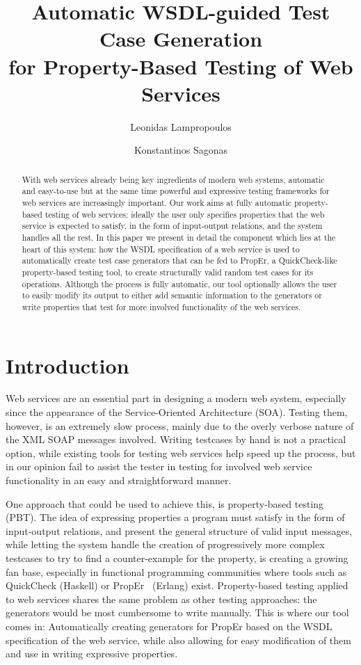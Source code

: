 \documentclass[submission,copyright,a4]{eptcs}
\title{Automatic WSDL-guided Test Case Generation\\
       for Property-Based Testing of Web Services}
\author{Leonidas Lampropoulos \and Konstantinos Sagonas}
\begin{document}
\maketitle

\begin{abstract}
With web services already being key ingredients of modern web systems,
automatic and easy-to-use but at the same time powerful and expressive
testing frameworks for web services are increasingly important. Our
work aims at fully automatic property-based testing of web services:
ideally the user only specifies properties that the web service is
expected to satisfy, in the form of input-output relations, and the
system handles all the rest. In this paper we present in detail the
component which lies at the heart of this system: how the WSDL
specification of a web service is used to automatically create test
case generators that can be fed to PropEr, a QuickCheck-like
property-based testing tool, to create structurally valid random
test cases for its operations. Although the process is fully automatic,
our tool optionally allows the user to easily modify its output to
either add semantic information to the generators or write properties
that test for more involved functionality of the web services.
\end{abstract}


\section{Introduction}


Web services are an essential part in designing a modern web system, 
especially since the appearance of the Service-Oriented Architecture (SOA).
Testing them, however, is an extremely slow process, mainly due to
the overly verbose nature of the XML SOAP messages involved. Writing 
testcases by hand is not a practical option, while existing tools for 
testing web services help speed up the process, but in our opinion fail 
to assist the tester in testing for involved web service functionality
in an easy and straightforward manner.


One approach that could be used to achieve this, is property-based testing (PBT).
The idea of expressing properties a program must satisfy in the form of 
input-output relations, and present the general structure of valid input 
messages, while letting the system handle the creation of progressively more 
complex testcases to try to find a counter-example for the property, is creating 
a growing fan base, especially in functional programming communities where 
tools such as QuickCheck (Haskell) or PropEr ~\cite{proper_tool}(Erlang) exist. 
Property-based testing applied to web services shares the same problem as other testing
approaches: the generators would be most cumbersome to write manually. This is
where our tool comes in: Automatically creating generators for PropEr based on 
the WSDL specification of the web service, while also allowing for easy 
modification of them and use in writing expressive properties.
\end{document}
